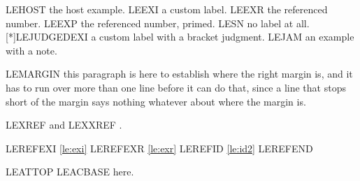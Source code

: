 

\begin{exe}
\ex\label{le:host} LEHOST the host example.
\label{le:exi} LEEXI a custom label.
\label{le:exr} LEEXR the referenced number.
 LEEXP the referenced number, primed.
\sn LESN no label at all.
[*]{\label{le:id2}LEJUDGEDEXI a custom label with a bracket judgment.}
\ex LEJAM an example with a note.
\end{exe}

LEMARGIN this paragraph is here to establish where the right margin is, and
it has to run over more than one line before it can do that, since a line
that stops short of the margin says nothing whatever about where the margin
is.

LEXREF  and LEXXREF .

LEREFEXI \ref{le:exi} LEREFEXR \ref{le:exr} LEREFID \ref{le:id2} LEREFEND

\ea LEATTOP  LEACBASE  here.
\z

